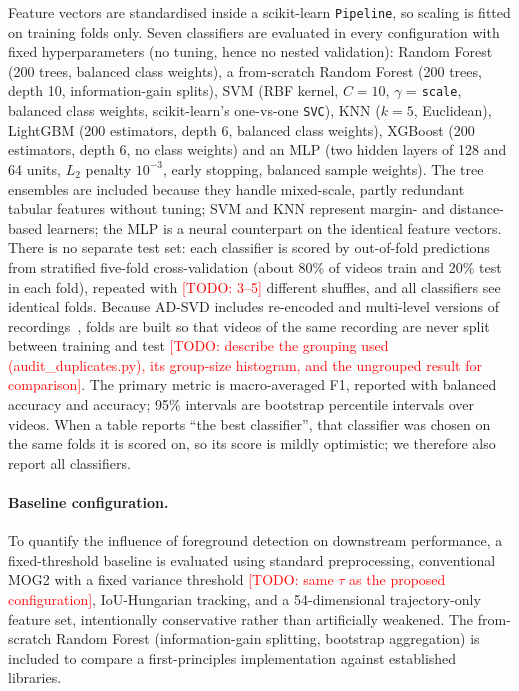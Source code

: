 \documentclass[runningheads]{llncs}
\newcommand{\todo}[1]{\textcolor{red}{[TODO: #1]}}
\begin{document}
Feature vectors are standardised inside a scikit-learn \texttt{Pipeline}, so scaling is fitted on 
training folds only. Seven classifiers are evaluated in every configuration with fixed 
hyperparameters (no tuning, hence no nested validation): Random Forest (200 trees, balanced class 
weights), a from-scratch Random Forest (200 trees, depth 10, information-gain splits), SVM (RBF kernel, 
$C=10$, $\gamma$ = \texttt{scale}, balanced class weights, scikit-learn's one-vs-one \texttt{SVC}), 
KNN ($k=5$, Euclidean), LightGBM (200 estimators, depth 6, balanced class weights), 
XGBoost (200 estimators, depth 6, no class weights) and an MLP (two hidden layers of 128 and 64 units, 
$L_2$ penalty $10^{-3}$, early stopping, balanced sample weights). The tree ensembles are included because 
they handle mixed-scale, partly redundant tabular features without tuning; SVM and KNN represent 
margin- and distance-based learners; the MLP is a neural counterpart on the identical feature vectors. 
There is no separate test set: each classifier is scored by out-of-fold predictions from stratified 
five-fold cross-validation (about 80\% of videos train and 20\% test in each fold), repeated with 
\todo{3--5} different shuffles, and all classifiers see identical folds. Because AD-SVD includes 
re-encoded and multi-level versions of recordings~\cite{akyk-7b78-20}, folds are built so that videos of the 
same recording are never split between training and test \todo{describe the grouping used (audit\_duplicates.py), 
its group-size histogram, and the ungrouped result for comparison}. The primary metric is macro-averaged F1, 
reported with balanced accuracy and accuracy; 95\% intervals are bootstrap percentile intervals over videos. 
When a table reports ``the best classifier'', that classifier was chosen on the same folds it is scored on, 
so its score is mildly optimistic; we therefore also report all classifiers.

\paragraph{Baseline configuration.}

To quantify the influence of foreground detection on downstream performance, 
a fixed-threshold baseline is evaluated using standard preprocessing, 
conventional MOG2 with a fixed variance threshold \todo{same $\tau$ as the proposed configuration}, 
IoU-Hungarian tracking, and a 54-dimensional trajectory-only feature set, 
intentionally conservative rather than artificially weakened. 
The from-scratch Random Forest (information-gain splitting, bootstrap aggregation) 
is included to compare a first-principles implementation against established libraries.
\end{document}
